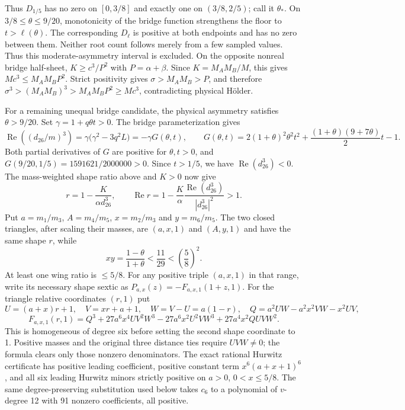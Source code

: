 \documentclass[11pt]{amsart}
\theoremstyle{remark}
\begin{document}
Thus $D_{1/5}$ has no zero on $[0,3/8]$ and exactly one on $(3/8,2/5)$; call it $\theta_*$. On $3/8\le\theta\le9/20$, monotonicity of the bridge function strengthens the floor to $t>\ell(\theta)$. The corresponding $D_\ell$ is positive at both endpoints and has no zero between them. Neither root count follows merely from a few sampled values. Thus this moderate-asymmetry interval is excluded. On the opposite nonreal bridge half-sheet, $K\ge c^3/P^2$ with $P=\alpha+\beta$. Since $K=M_AM_B/M$, this gives $Mc^3\le M_AM_BP^2$. Strict positivity gives $\sigma>M_AM_B>P$, and therefore $\sigma^3>(M_AM_B)^3>M_AM_BP^2\ge Mc^3$, contradicting physical H\"older.

For a remaining unequal bridge candidate, the physical asymmetry satisfies $\theta>9/20$. Set $\gamma=1+q\theta t>0$. The bridge parameterization gives
\[
\operatorname{Re}\!\left((d_{26}/m)^3\right)
=\gamma\bigl(\gamma^2-3q^2L\bigr)=-\gamma G(\theta,t),\qquad
G(\theta,t)=2(1+\theta)^2\theta^2t^2
+\frac{(1+\theta)(9+7\theta)}{2}t-1.
\]
Both partial derivatives of $G$ are positive for $\theta,t>0$, and $G(9/20,1/5)=1591621/2000000>0$. Since $t>1/5$, we have $\operatorname{Re}(d_{26}^3)<0$. The mass-weighted shape ratio above and $K>0$ now give
\[
r=1-\frac{K}{\alpha d_{26}^3},\qquad
\operatorname{Re}r
=1-\frac{K}{\alpha}\frac{\operatorname{Re}(d_{26}^3)}{|d_{26}^3|^2}>1.
\]
Put $a=m_1/m_3$, $A=m_4/m_5$, $x=m_2/m_3$ and $y=m_6/m_5$. The two closed triangles, after scaling their masses, are $(a,x,1)$ and $(A,y,1)$ and have the same shape $r$, while
\begin{equation}\label{eq:no79-wing-ratio}
xy=\frac{1-\theta}{1+\theta}<\frac{11}{29}<\left(\frac58\right)^2.
\end{equation}
At least one wing ratio is $\le5/8$. For any positive triple $(a,x,1)$ in that range, write its necessary shape sextic as $P_{a,x}(z)=-F_{a,x,1}(1+z,1)$. For the triangle relative coordinates $(r,1)$ put
\[
U=(a+x)r+1,\quad V=xr+a+1,\quad W=V-U=a(1-r),\quad Q=a^2UW-a^2x^2VW-x^2UV,
\]
\[
F_{a,x,1}(r,1)=Q^3+27a^6x^4UV^2W^3-27a^6x^2U^2VW^3+27a^4x^2QUVW^2.
\]
This is homogeneous of degree six before setting the second shape coordinate to 1. Positive masses and the original three distance ties require $UVW\ne0$; the formula clears only those nonzero denominators. The exact rational Hurwitz certificate has positive leading coefficient, positive constant term $x^6(a+x+1)^6$, and all six leading Hurwitz minors strictly positive on $a>0$, $0<x\le5/8$. The same degree-preserving substitution used below takes $c_6$ to a polynomial of $v$-degree 12 with 91 nonzero coefficients, all positive.
\end{document}
